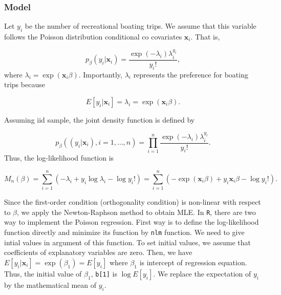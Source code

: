 \documentclass[
  12pt,
]{article}
\begin{document}
\hypertarget{model-4}{%
\subsubsection{Model}\label{model-4}}

Let \(y_i\) be the number of recreational boating trips.
We assume that this variable follows the Poisson distribution conditional co covariates \(\mathbf{x}_i\).
That is,

\begin{equation*}
  p_{\beta}(y_i | \mathbf{x}_i) = \frac{\exp(-\lambda_i) \lambda_i^{y_i}}{y_i !},
\end{equation*}
where \(\lambda_i = \exp(\mathbf{x}_i \beta)\).
Importantly, \(\lambda_i\) represents the preference for boating trips because

\begin{equation*}
  E[y_i | \mathbf{x}_i] = \lambda_i = \exp(\mathbf{x}_i \beta).
\end{equation*}

Assuming iid sample, the joint density function is defined by

\begin{equation*}
  p_{\beta}((y_i|\mathbf{x}_i), i = 1, \ldots, n) = \prod_{i=1}^n \frac{\exp(-\lambda_i) \lambda_i^{y_i}}{y_i !}.
\end{equation*}
Thus, the log-likelihood function is

\begin{equation*}
  M_n(\beta) 
  = \sum_{i=1}^n (-\lambda_i + y_i \log \lambda_i - \log y_i !)  
  = \sum_{i=1}^n (- \exp(\mathbf{x}_i \beta) + y_i \mathbf{x}_i \beta - \log y_i !).
\end{equation*}

Since the first-order condition (orthogonality condition) is non-linear with respect to \(\beta\),
we apply the Newton-Raphson method to obtain MLE.
In \texttt{R}, there are two way to implement the Poisson regression.
First way is to define the log-likelihood function directly and minimize its function by \texttt{nlm} function.
We need to give intial values in argument of this function.
To set initial values, we assume that coefficients of explanatory variables are zero.
Then, we have \(E[y_i | \mathbf{x}_i] = \exp(\beta_1) = E[y_i]\) where \(\beta_1\) is intercept of regression equation.
Thus, the initial value of \(\beta_1\), \texttt{b{[}1{]}} is \(\log E[y_i]\).
We replace the expectation of \(y_i\) by the mathematical mean of \(y_i\).
\end{document}
